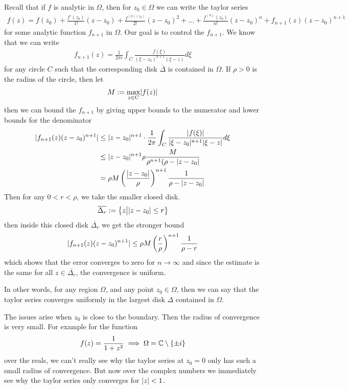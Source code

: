 Recall that if $f$ is analytic in $\Omega$, then for $z_0 \in \Omega$ we can write the taylor series
\begin{align*}
	f(z) = f(z_0) + \frac{f'(z_0)}{1!}(z-z_0) + \frac{f^{(2)(z_0)}}{2!}(z-z_0)^{2} + \ldots + \frac{f^{(n)}(z_0)}{n!}(z-z_0)^{n} + f_{n+1}(z)(z-z_0)^{n+1}
\end{align*}
for some analytic function $f_{n+1}$ in $\Omega$. Our goal is to control the $f_{n+1}$. We know that we can write
\begin{align*}
	f_{n+1}(z) = \frac{1}{2\pi i}\int_{C} \frac{f(\xi)}{(\xi - z_0)^{n+1}(\xi - z)}d \xi
\end{align*}
for any circle $C$ such that the corresponding disk $\overline{\Delta}$ is contained in $\Omega$. If $\rho > 0$ is the radius of the circle, then let 
\begin{align*}
	M := \max_{z \in C}\abs{f(z)}
\end{align*}
then we can bound the $f_{n+1}$ by giving upper bounds to the numerator and lower bounds for the denominator
\begin{align*}
		\vert f_{n+1}(z)(z- z_0)^{n+1}\vert 
	&\leq
	\vert z - z_0\vert^{n+1} \cdot \frac{1}{2\pi} \int_{C} \frac{\vert f(\xi)\vert}{\vert\xi - z_0\vert^{n+1}\vert\xi - z\vert} d \xi\\
	&\leq \vert z - z_0\vert^{n+1} \rho \frac{M}{\rho^{n+1} (\rho - \vert z - z_0\vert} \\
	&= \rho M \left(
		\frac{\vert z - z_0\vert}{\rho}
	\right)^{n+1}
	\frac{1}{\rho - \vert z - z_0\vert}
\end{align*}
Then for any $0 < r < \rho$, we take the smaller closed disk.
\begin{align*}
	\overline{\Delta_r} := \left\{z \big\vert \vert z - z_0\vert \leq r\right\}
\end{align*}
then inside this closed disk $\overline{\Delta_r}$ we get the stronger bound
\begin{align*}
	\vert f_{n+1}(z) (z - z_0)^{n+1}\vert \leq \rho M \left(
		\frac{r}{\rho}
	\right)^{n+1} \frac{1}{\rho - r}
\end{align*}
which shows that the error converges to zero for $n \to \infty$ and since the estimate is the same for all $z \in \overline{\Delta_r}$, the convergence is uniform.

In other words, for any region $\Omega$, and any point $z_0 \in \Omega$, then we can say that the taylor series converges uniformly in the largest disk $\Delta$ contained in $\Omega$.

The issues arise when $z_0$ is close to the boundary. Then the radius of convergence is very small. For example for the function
\begin{align*}
	f(z) = \frac{1}{1 + z^2} \implies \Omega = \mathbb{C} \setminus \{\pm i\}
\end{align*}
over the reals, we can't really see why the taylor series at $z_0 = 0$ only has such a small radius of convergence. But now over the complex numbers we immediately see why the taylor series only converges for $\vert z\vert < 1$.

